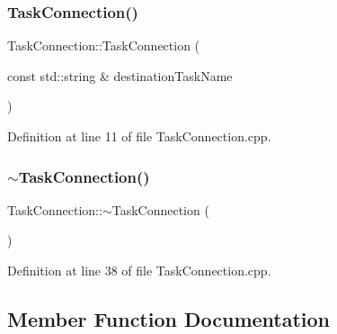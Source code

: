 \hypertarget{classocra__recipes_1_1TaskConnection_a8a7b431e1c53e50428e3c369892d266e}{}\label{classocra__recipes_1_1TaskConnection_a8a7b431e1c53e50428e3c369892d266e} 
\subsubsection{\texorpdfstring{Task\+Connection()}{TaskConnection()}\hspace{0.1cm}{\footnotesize\ttfamily [2/2]}}
{\footnotesize\ttfamily Task\+Connection\+::\+Task\+Connection (\begin{DoxyParamCaption}\item[{const std\+::string \&}]{destination\+Task\+Name }\end{DoxyParamCaption})}



Definition at line 11 of file Task\+Connection.\+cpp.

\hypertarget{classocra__recipes_1_1TaskConnection_aa2a733dfaa80f32fa95f45c2d98f6106}{}\label{classocra__recipes_1_1TaskConnection_aa2a733dfaa80f32fa95f45c2d98f6106} 
\subsubsection{\texorpdfstring{$\sim$\+Task\+Connection()}{~TaskConnection()}}
{\footnotesize\ttfamily Task\+Connection\+::$\sim$\+Task\+Connection (\begin{DoxyParamCaption}{ }\end{DoxyParamCaption})\hspace{0.3cm}{\ttfamily [virtual]}}



Definition at line 38 of file Task\+Connection.\+cpp.



\subsection{Member Function Documentation}
\hypertarget{classocra__recipes_1_1TaskConnection_a64c0f6623daace3ac9030ec620ed98a2}{}\label{classocra__recipes_1_1TaskConnection_a64c0f6623daace3ac9030ec620ed98a2} 
